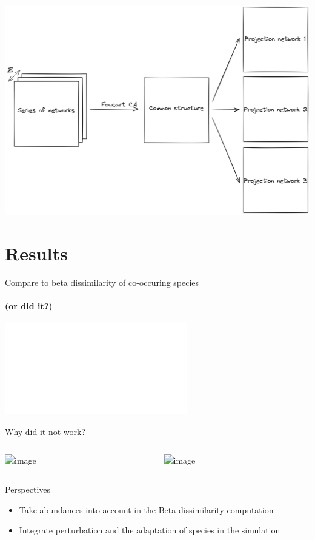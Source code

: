 \documentclass{beamer}
\begin{document}
\begin{frame}{}
\protect\hypertarget{foucart-ca}{}
\\ [0.5cm]
\includegraphics[width=0.9\linewidth]{figures_slides/foucart.png}%
\end{frame}

\section{Results}

\begin{frame}{Compare to beta dissimilarity of co-occuring species}
  \framesubtitle{(or did it?)}
  \includegraphics<1->[width=\linewidth]{figures_slides/rewiring.pdf}%
\end{frame}


\begin{frame}{Why did it not work?}
  \begin{columns}
    \begin{column}{.5\linewidth}
      \includegraphics<1->[width=\linewidth]{figures_slides/foucart_limits.png}%
    \end{column}
    \begin{column}{.5\linewidth}
      \includegraphics<2->[width=\linewidth]{figures_slides/simulation_limits.png}%
    \end{column}
  \end{columns}
\end{frame}

\begin{frame}{Perspectives}
\protect\hypertarget{perspectives}{}
\begin{itemize}
\item
  Take abundances into account in the Beta dissimilarity computation
\item
  Integrate perturbation and the adaptation of species in the simulation
\end{itemize}
\end{frame}
\end{document}
